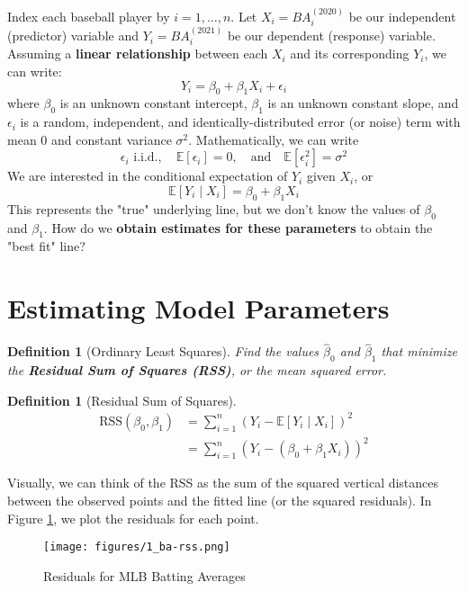 \documentclass[twoside]{article}
\newtheorem{definition}[theorem]{Definition}
\theoremstyle{definition}
\begin{document}
Index each baseball player by $i = 1, \ldots, n$. Let $X_i = BA_{i}^{(2020)}$ be our independent (predictor) variable and $Y_i = BA_{i}^{(2021)}$ be our dependent (response) variable. Assuming a \textbf{linear relationship} between each $X_i$ and its corresponding $Y_i$, we can write:
\begin{equation}
    Y_i = \beta_0 + \beta_1 X_i + \epsilon_i
\end{equation}
where $\beta_0$ is an unknown constant intercept, $\beta_1$ is an unknown constant slope, and $\epsilon_i$ is a random, independent, and identically-distributed error (or noise) term with mean $0$ and constant variance $\sigma^2$. Mathematically, we can write
\begin{equation}
    \epsilon_i \text{ i.i.d.}, \quad \mathbb{E}[\epsilon_i] = 0, \quad \text{and} \quad \mathbb{E}[\epsilon_i^2] = \sigma^2
\end{equation}
We are interested in the conditional expectation of $Y_i$ given $X_i$, or
\begin{equation}
    \mathbb{E}[Y_i \mid X_i] = \beta_0 + \beta_1 X_i
\end{equation}
This represents the "true" underlying line, but we don't know the values of $\beta_0$ and $\beta_1$. How do we \textbf{obtain estimates for these parameters} to obtain the "best fit" line?

\section{Estimating Model Parameters}

\begin{definition}[Ordinary Least Squares]
Find the values $\widehat{\beta}_0$ and $\widehat{\beta}_1$ that minimize the \textbf{Residual Sum of Squares (RSS)}, or the mean squared error.
\end{definition}
\begin{definition}[Residual Sum of Squares]
\begin{align}
    \text{RSS}(\beta_0, \beta_1) &= \sum_{i=1}^n (Y_i - \mathbb{E}[Y_i \mid X_i])^2 \nonumber \\
    &= \sum_{i=1}^n (Y_i - (\beta_0 + \beta_1 X_i))^2
\end{align}
\end{definition}
Visually, we can think of the RSS as the sum of the squared vertical distances between the observed points and the fitted line (or the squared residuals). In Figure \ref{fig:ba-rss}, we plot the residuals for each point. 
\begin{figure}[h]
    \centering
    \texttt{[image: figures/1\_ba-rss.png]}
    \caption{Residuals for MLB Batting Averages}
    \label{fig:ba-rss}
\end{figure}
\end{document}
